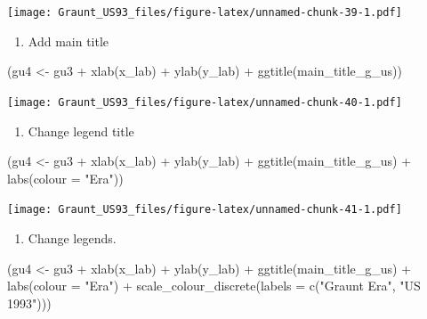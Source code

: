 \documentclass[
]{article}
\newenvironment{Shaded}{\begin{snugshade}}{\end{snugshade}}
\newcommand{\AttributeTok}[1]{\textcolor[rgb]{0.77,0.63,0.00}{#1}}
\newcommand{\FunctionTok}[1]{\textcolor[rgb]{0.00,0.00,0.00}{#1}}
\newcommand{\NormalTok}[1]{#1}
\newcommand{\OtherTok}[1]{\textcolor[rgb]{0.56,0.35,0.01}{#1}}
\newcommand{\SpecialCharTok}[1]{\textcolor[rgb]{0.00,0.00,0.00}{#1}}
\newcommand{\StringTok}[1]{\textcolor[rgb]{0.31,0.60,0.02}{#1}}
\providecommand{\tightlist}{%
  \setlength{\itemsep}{0pt}\setlength{\parskip}{0pt}}
\begin{document}
\texttt{[image: Graunt\_US93\_files/figure-latex/unnamed-chunk-39-1.pdf]}

\begin{enumerate}
\def\labelenumi{\arabic{enumi}.}
\setcounter{enumi}{1}
\tightlist
\item
  Add main title
\end{enumerate}

\begin{Shaded}
\begin{Highlighting}[]
\NormalTok{(gu4 }\OtherTok{\textless{}{-}}\NormalTok{ gu3 }\SpecialCharTok{+} 
   \FunctionTok{xlab}\NormalTok{(x\_lab) }\SpecialCharTok{+} 
   \FunctionTok{ylab}\NormalTok{(y\_lab) }\SpecialCharTok{+} 
   \FunctionTok{ggtitle}\NormalTok{(main\_title\_g\_us))}
\end{Highlighting}
\end{Shaded}

\texttt{[image: Graunt\_US93\_files/figure-latex/unnamed-chunk-40-1.pdf]}

\begin{enumerate}
\def\labelenumi{\arabic{enumi}.}
\setcounter{enumi}{2}
\tightlist
\item
  Change legend title
\end{enumerate}

\begin{Shaded}
\begin{Highlighting}[]
\NormalTok{(gu4 }\OtherTok{\textless{}{-}}\NormalTok{ gu3 }\SpecialCharTok{+} 
   \FunctionTok{xlab}\NormalTok{(x\_lab) }\SpecialCharTok{+} 
   \FunctionTok{ylab}\NormalTok{(y\_lab) }\SpecialCharTok{+} 
   \FunctionTok{ggtitle}\NormalTok{(main\_title\_g\_us) }\SpecialCharTok{+}
   \FunctionTok{labs}\NormalTok{(}\AttributeTok{colour =} \StringTok{"Era"}\NormalTok{))}
\end{Highlighting}
\end{Shaded}

\texttt{[image: Graunt\_US93\_files/figure-latex/unnamed-chunk-41-1.pdf]}

\begin{enumerate}
\def\labelenumi{\arabic{enumi}.}
\setcounter{enumi}{3}
\tightlist
\item
  Change legends.
\end{enumerate}

\begin{Shaded}
\begin{Highlighting}[]
\NormalTok{(gu4 }\OtherTok{\textless{}{-}}\NormalTok{ gu3 }\SpecialCharTok{+} 
   \FunctionTok{xlab}\NormalTok{(x\_lab) }\SpecialCharTok{+} 
   \FunctionTok{ylab}\NormalTok{(y\_lab) }\SpecialCharTok{+}
   \FunctionTok{ggtitle}\NormalTok{(main\_title\_g\_us) }\SpecialCharTok{+}
   \FunctionTok{labs}\NormalTok{(}\AttributeTok{colour =} \StringTok{"Era"}\NormalTok{) }\SpecialCharTok{+}
   \FunctionTok{scale\_colour\_discrete}\NormalTok{(}\AttributeTok{labels =} \FunctionTok{c}\NormalTok{(}\StringTok{"Graunt Era"}\NormalTok{, }\StringTok{"US 1993"}\NormalTok{)))}
\end{Highlighting}
\end{Shaded}
\end{document}
